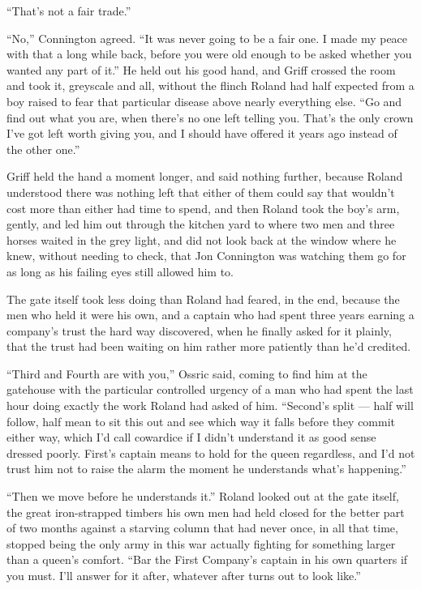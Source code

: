 “That’s not a fair trade.”

“No,” Connington agreed. “It was never going to be a fair one. I made my peace with that a long while back, before you were old enough to be asked whether you wanted any part of it.” He held out his good hand, and Griff crossed the room and took it, greyscale and all, without the flinch Roland had half expected from a boy raised to fear that particular disease above nearly everything else. “Go and find out what you are, when there’s no one left telling you. That’s the only crown I’ve got left worth giving you, and I should have offered it years ago instead of the other one.”

Griff held the hand a moment longer, and said nothing further, because Roland understood there was nothing left that either of them could say that wouldn’t cost more than either had time to spend, and then Roland took the boy’s arm, gently, and led him out through the kitchen yard to where two men and three horses waited in the grey light, and did not look back at the window where he knew, without needing to check, that Jon Connington was watching them go for as long as his failing eyes still allowed him to.

\sceneBreak

The gate itself took less doing than Roland had feared, in the end, because the men who held it were his own, and a captain who had spent three years earning a company’s trust the hard way discovered, when he finally asked for it plainly, that the trust had been waiting on him rather more patiently than he’d credited.

“Third and Fourth are with you,” Ossric said, coming to find him at the gatehouse with the particular controlled urgency of a man who had spent the last hour doing exactly the work Roland had asked of him. “Second’s split — half will follow, half mean to sit this out and see which way it falls before they commit either way, which I’d call cowardice if I didn’t understand it as good sense dressed poorly. First’s captain means to hold for the queen regardless, and I’d not trust him not to raise the alarm the moment he understands what’s happening.”

“Then we move before he understands it.” Roland looked out at the gate itself, the great iron-strapped timbers his own men had held closed for the better part of two months against a starving column that had never once, in all that time, stopped being the only army in this war actually fighting for something larger than a queen’s comfort. “Bar the First Company’s captain in his own quarters if you must. I’ll answer for it after, whatever after turns out to look like.”

